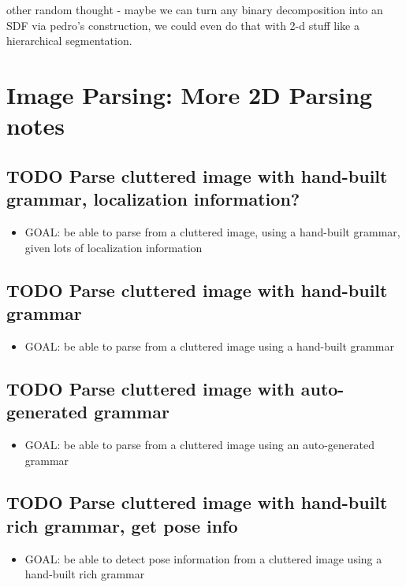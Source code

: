 \documentclass{book}
\begin{document}
other random thought - maybe we can turn any binary decomposition into
an SDF via pedro's construction, we could even do that with 2-d stuff
like a hierarchical segmentation.
\section{Image Parsing: More 2D Parsing notes}
\label{sec-7_27}
\subsection{\textbf{TODO} Parse cluttered image with hand-built grammar, localization information?}
\label{sec-7_27_1}

\begin{itemize}
\item GOAL: be able to parse from a cluttered image, using a hand-built
    grammar, given lots of localization information
\end{itemize}
\subsection{\textbf{TODO} Parse cluttered image with hand-built grammar}
\label{sec-7_27_2}

\begin{itemize}
\item GOAL: be able to parse from a cluttered image using a hand-built
    grammar
\end{itemize}
\subsection{\textbf{TODO} Parse cluttered image with auto-generated grammar}
\label{sec-7_27_3}

\begin{itemize}
\item GOAL: be able to parse from a cluttered image using an
    auto-generated grammar
\end{itemize}
\subsection{\textbf{TODO} Parse cluttered image with hand-built rich grammar, get pose info}
\label{sec-7_27_4}

\begin{itemize}
\item GOAL: be able to detect pose information from a cluttered image
    using a hand-built rich grammar
\end{itemize}
\end{document}
